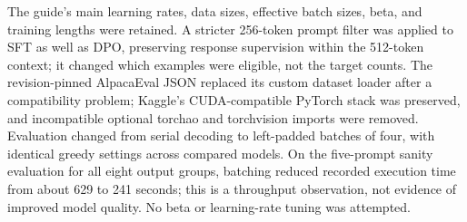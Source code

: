 The guide's main learning rates, data sizes, effective batch sizes, beta, and training lengths were retained. A stricter 256-token prompt filter was applied to SFT as well as DPO, preserving response supervision within the 512-token context; it changed which examples were eligible, not the target counts. The revision-pinned AlpacaEval JSON replaced its custom dataset loader after a compatibility problem; Kaggle's CUDA-compatible PyTorch stack was preserved, and incompatible optional torchao and torchvision imports were removed. Evaluation changed from serial decoding to left-padded batches of four, with identical greedy settings across compared models. On the five-prompt sanity evaluation for all eight output groups, batching reduced recorded execution time from about 629 to 241 seconds; this is a throughput observation, not evidence of improved model quality. No beta or learning-rate tuning was attempted.

